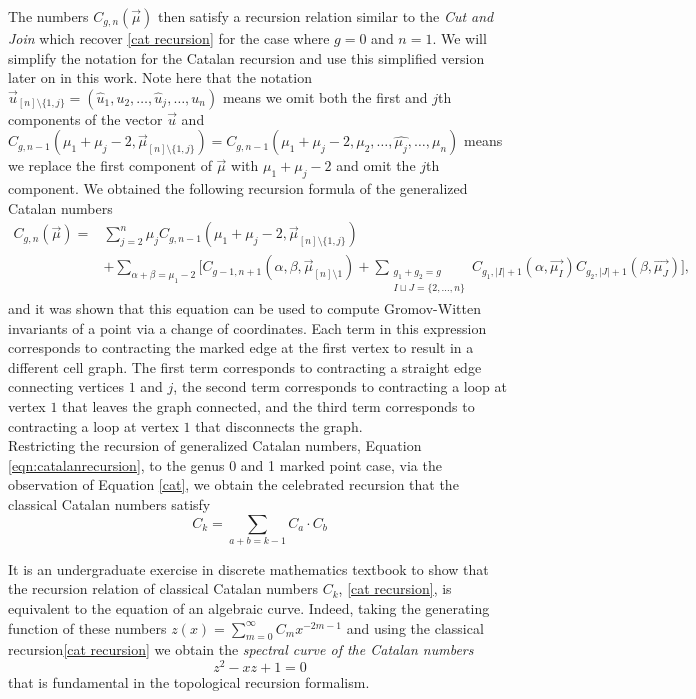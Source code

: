 \documentclass{amsart}
\newcommand{\be}{\begin{equation}}
\newcommand{\ee}{\end{equation}}
\theoremstyle{definition}
\begin{document}
The numbers $C_{g,n}(\vec{\mu})$ then satisfy a recursion relation similar to the \textit{Cut and Join} which recover \ref{cat recursion} for the case where $g=0$ and $n=1$. We will simplify the notation for the Catalan recursion and use this simplified version later on in this work. Note here that the notation $\vec{u}_{[n]\setminus \{1,j\}}=(\widehat{u}_1,u_2,\ldots,\widehat{u}_j,\ldots,u_n)$ means we omit both the first and $j$th components of the vector $\vec{u}$ and $C_{g,n-1}(\mu_1+\mu_j-2,\vec{\mu}_{[n]\setminus\{1,j\}})=C_{g,n-1}(\mu_1+\mu_j-2,\mu_2,\ldots, \widehat{\mu_j}, \ldots, \mu_n)$ means we replace the first component of $\vec{\mu}$ with $\mu_1+\mu_j-2$ and omit the $j$th component. We obtained the following recursion formula of the generalized Catalan numbers \cite{DMSS,DM_invitation} 
\be\label{eqn:catalanrecursion}
\begin{aligned}
	C_{g,n}(\vec{\mu})=&\sum_{j=2}^n \mu_jC_{g,n-1}(\mu_1+\mu_j-2,\vec{\mu}_{[n]\setminus\{1,j\}})\\&+\sum_{\alpha+\beta=\mu_1-2}\Biggl[C_{g-1,n+1}(\alpha,\beta,\vec{\mu}_{[n]\setminus1})+\sum_{\substack{g_1+g_2=g\\I\sqcup J=\{2,\ldots,n\}}}C_{g_1,|I|+1}(\alpha,\vec{\mu_I})C_{g_2,|J|+1}(\beta,\vec{\mu_J})\Biggr],
\end{aligned}
\ee
and it was shown that this equation can be used to compute Gromov-Witten invariants of a point via a change of coordinates. Each term in this expression corresponds to contracting the marked edge at the first vertex to result in a different cell graph. The first term corresponds to contracting a straight edge connecting vertices $1$ and $j$, the second term corresponds to contracting a loop at vertex $1$ that leaves the graph connected, and the third term corresponds to contracting a loop at vertex $1$ that disconnects the graph.\\


Restricting the recursion of generalized Catalan numbers, Equation \ref{eqn:catalanrecursion}, to the genus 0 and 1 marked point case, via the observation of Equation \ref{cat}, we obtain the celebrated recursion that the classical Catalan numbers satisfy
\be\label{cat recursion}
C_k=\sum_{a+b=k-1} C_a \cdot C_b
\ee

It is an undergraduate exercise in discrete mathematics textbook to show that
the recursion relation of classical Catalan numbers $C_k$, \ref{cat recursion}, is equivalent to the equation of an algebraic curve. Indeed, taking the generating function of these numbers $z(x)=\sum_{m=0}^{\infty} C_{m}x^{-2m-1}$ 
 and using the classical recursion\ref{cat recursion} we obtain the {\it spectral curve of the Catalan numbers}
\be\label{cat curve}
z^2-xz+1=0
\ee
 that is fundamental in the topological recursion formalism.
\end{document}
